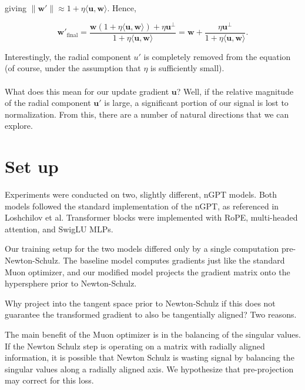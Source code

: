 \documentclass{article}
\begin{document}
giving $\lVert \mathbf{w}' \rVert \approx 1 + \eta \langle \mathbf{u},\mathbf{w} \rangle$. Hence,

$$\mathbf{w}'_\text{final} = \frac{\mathbf{w} (1 +\eta \langle \mathbf{u},\mathbf{w} \rangle) + \eta \mathbf{u}^\perp}{1 + \eta \langle \mathbf{u},\mathbf{w} \rangle}=\mathbf{w} + \frac{\eta \mathbf{u}^\perp}{1+\eta \langle \mathbf{u}, \mathbf{w} \rangle}.$$

Interestingly, the radial component $u'$ is completely removed from the equation (of course, under the assumption that $\eta$ is sufficiently small). 
\\
\\
What does this mean for our update gradient $\mathbf{u}$? Well, if the relative magnitude of the radial component $\mathbf{u}'$ is large, a significant portion of our signal is lost to normalization. From this, there are a number of natural directions that we can explore.

\section{Set up}

Experiments were conducted on two, slightly different, nGPT models. Both models followed the standard implementation of the nGPT, as referenced in Loshchilov et al. Transformer blocks were implemented with RoPE, multi-headed attention, and SwigLU MLPs. \newline

Our training setup for the two models differed only by a single computation pre-Newton-Schulz. The baseline model computes gradients just like the standard Muon optimizer, and our modified model projects the gradient matrix onto the hypersphere prior to Newton-Schulz. \newline

Why project into the tangent space prior to Newton-Schulz if this does not guarantee the transformed gradient to also be tangentially aligned? Two reasons.

The main benefit of the Muon optimizer is in the balancing of the singular values. If the Newton Schulz step is operating on a matrix with radially aligned information, it is possible that Newton Schulz is wasting signal by balancing the singular values along a radially aligned axis. We hypothesize that pre-projection may correct for this loss.
\end{document}
